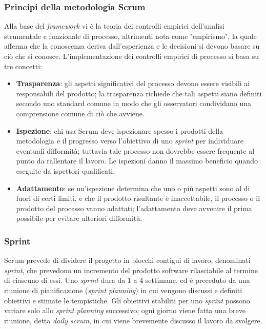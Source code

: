 \subsubsection{Principi della metodologia Scrum}
Alla base del \textit{framework} vi è la teoria dei controlli empirici dell'analisi strumentale e funzionale di processo, altrimenti nota come "empirismo", la quale afferma che la conoscenza deriva dall'esperienza e le decisioni si devono basare su ciò che si conosce. L'implementazione dei controlli empirici di processo si basa su tre concetti:
\begin{itemize}
    \item \textbf{Trasparenza}: gli aspetti significativi del processo devono essere visibili ai responsabili del prodotto; la trasparenza richiede che tali aspetti siano definiti secondo uno standard comune in modo che gli osservatori condividano una comprensione comune di ciò che avviene.
    \item \textbf{Ispezione}: chi usa Scrum deve ispezionare spesso i prodotti della metodologia e il progresso verso l'obiettivo di uno \textit{sprint} per individuare eventuali difformità; tuttavia tale processo non dovrebbe essere frequente al punto da rallentare il lavoro. Le ispezioni danno il massimo beneficio quando eseguite da ispettori qualificati.
    \item \textbf{Adattamento}: se un'ispezione determina che uno o più aspetti sono al di fuori di certi limiti, e che il prodotto risultante è inaccettabile, il processo o il prodotto del processo vanno adattati; l'adattamento deve avvenire il prima possibile per evitare ulteriori difformità.
\end{itemize}
\vspace{-12pt}
\subsubsection{Sprint}
Scrum prevede di dividere il progetto in blocchi contigui di lavoro, denominati \textit{sprint}, che prevedono un incremento del prodotto software rilasciabile al termine di ciascuno di essi.
Uno \textit{sprint} dura da 1 a 4 settimane, ed è preceduto da una riunione di pianificazione (\textit{sprint planning}) in cui vengono discussi e definiti obiettivi e stimate le tempistiche. Gli obiettivi stabiliti per uno \textit{sprint} possono variare solo allo \textit{sprint planning} successivo; ogni giorno viene fatta una breve riunione, detta \textit{daily scrum}, in cui viene brevemente discusso il lavoro da svolgere.

